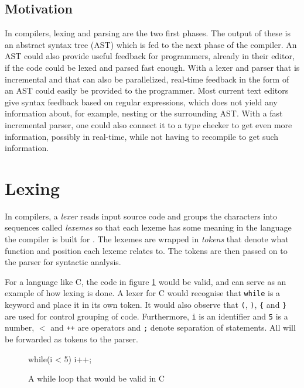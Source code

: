 \documentclass[a4paper,12pt,twosided]{report}
\renewcommand\cite{\citep}
\begin{document}
\subsection{Motivation}
In compilers, lexing and parsing are the two first phases. The output of these
is an abstract syntax tree (AST) which is fed to the next phase of the compiler.
An AST could also provide useful feedback for programmers, already in their
editor, if the code could be lexed and parsed fast enough. With a lexer and
parser that is incremental and that can also be parallelized, real-time feedback
in the form of an AST could easily be provided to the programmer. Most current
text editors give syntax feedback based on regular expressions, which does not
yield any information about, for example, nesting or the surrounding AST.  With a
fast incremental parser, one could also connect it to a type checker to get even
more information, possibly in real-time, while not having to recompile to get
such information.

\section{Lexing}
In compilers, a \textit{lexer} reads input source code and groups the characters
into sequences called \textit{lexemes} so that each lexeme has some meaning in
the language the compiler is built for \cite[p. 5, p. 109]{dragonbook}. The
lexemes are wrapped in \textit{tokens} that denote what function and position
each lexeme relates to. The tokens are then passed on to the parser for
syntactic analysis.

For a language like C, the code in figure \ref{lexsample} would be valid, and
can serve as an example of how lexing is done.  A lexer for C would recognise
that \texttt{while} is a keyword and place it in its own token. It would also
observe that \texttt{(}, \texttt{)}, \texttt{\{} and \texttt{\}} are used for
control grouping of code. Furthermore, \texttt{i} is an identifier and
\texttt{5} is a number, \texttt{$<$} and \texttt{++} are operators and
\texttt{;} denote separation of statements. All will be forwarded as tokens to
the parser.

\begin{figure}[H]
\begin{code}
while(i < 5) {
    i++;
}
\end{code}
\caption{A while loop that would be valid in C}
\label{lexsample}
\end{figure}
\end{document}
